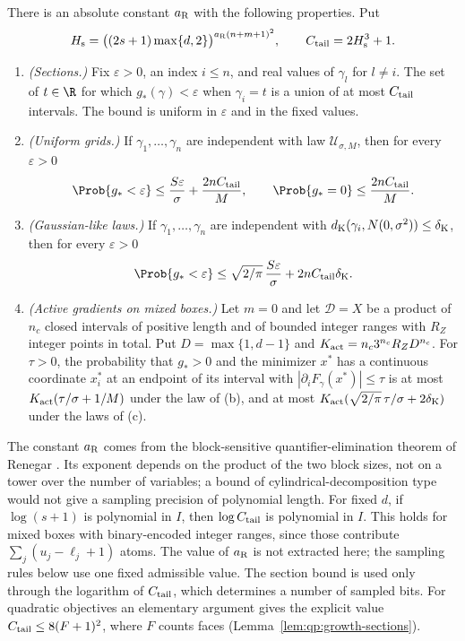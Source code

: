 \begin{lemma}\label{lem:count:finite-tails}
There is an absolute constant $a_{\rm R}$ with the following properties. Put
\[
 H_{\rm s}=\bigl((2s+1)\max\{d,2\}\bigr)^{a_{\rm R}(n+m+1)^2},
 \qquad
 C_{\rm tail}=2H_{\rm s}^3+1 .
\]
\begin{enumerate}[label=(\alph*)]
\item \emph{(Sections.)} Fix $\varepsilon>0$, an index $i\le n$, and real
 values of $\gamma_l$ for $l\ne i$. The set of $t\in\R$ for which
 $g_*(\gamma)<\varepsilon$ when $\gamma_i=t$ is a union of at most
 $C_{\rm tail}$ intervals. The bound is uniform in $\varepsilon$ and in the
 fixed values.
\item \emph{(Uniform grids.)} If $\gamma_1,\dots,\gamma_n$ are independent
 with law $\mathcal U_{\sigma,M}$, then for every $\varepsilon>0$
 \[
  \Prob\{g_*<\varepsilon\}\le\frac{S\varepsilon}{\sigma}+\frac{2nC_{\rm tail}}M,
  \qquad
  \Prob\{g_*=0\}\le\frac{2nC_{\rm tail}}M .
 \]
\item \emph{(Gaussian-like laws.)} If $\gamma_1,\dots,\gamma_n$ are
 independent with $d_{\rm K}(\gamma_i,N(0,\sigma^2))\le\delta_{\rm K}$, then
 for every $\varepsilon>0$
 \[
  \Prob\{g_*<\varepsilon\}\le\sqrt{2/\pi}\,\frac{S\varepsilon}{\sigma}
  +2nC_{\rm tail}\delta_{\rm K}.
 \]
\item \emph{(Active gradients on mixed boxes.)} Let $m=0$ and let
 $\mathcal D=X$ be a product of $n_c$ closed intervals of positive length
 and of bounded integer ranges with $R_Z$ integer points in total. Put
 $D=\max\{1,d-1\}$ and $K_{\rm act}=n_c3^{n_c}R_ZD^{n_c}$. For $\tau>0$, the
 probability that $g_*>0$ and the minimizer $x^*$ has a continuous
 coordinate $x_i^*$ at an endpoint of its interval with
 $|\partial_iF_\gamma(x^*)|\le\tau$ is at most
 $K_{\rm act}(\tau/\sigma+1/M)$ under the law of (b), and at most
 $K_{\rm act}(\sqrt{2/\pi}\,\tau/\sigma+2\delta_{\rm K})$ under the laws
 of (c).
\end{enumerate}
\end{lemma}

The constant $a_{\rm R}$ comes from the block-sensitive quantifier-elimination
theorem of Renegar \cite{renegar1992-on-the-computational-complexity-and}.
Its exponent depends on the product of the two block sizes, not on a tower
over the number of variables; a bound of cylindrical-decomposition type would
not give a sampling precision of polynomial length. For fixed $d$, if
$\log(s+1)$ is polynomial in $I$, then $\log C_{\rm tail}$ is polynomial in
$I$. This holds for mixed boxes with binary-encoded integer ranges, since
those contribute $\sum_j(u_j-\ell_j+1)$ atoms. The value of $a_{\rm R}$ is not
extracted here; the sampling rules below use one fixed admissible value. The
section bound is used only through the logarithm of $C_{\rm tail}$, which
determines a number of sampled bits. For quadratic objectives an elementary
argument gives the explicit value $C_{\rm tail}\le8(F+1)^2$, where $F$ counts
faces (Lemma~\ref{lem:qp:growth-sections}).


